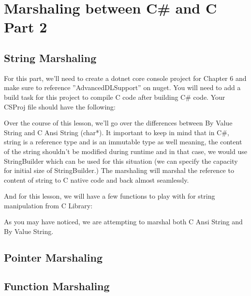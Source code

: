 \chapter{Marshaling between C\# and C Part 2}
\section{String Marshaling}
For this part, we'll need to create a dotnet core console project for Chapter 6 and make sure to reference ''AdvancedDLSupport'' on nuget. You will need to add a build task for this project to compile C code after building C\# code. Your CSProj file should have the following:


Over the course of this lesson, we'll go over the differences between By Value String and C Ansi String (char*). It important to keep in mind that in C\#, string is a reference type and is an immutable type as well meaning, the content of the string shouldn't be modified during runtime and in that case, we would use StringBuilder which can be used for this situation (we can specify the capacity for initial size of StringBuilder.) The marshaling will marshal the reference to content of string to C native code and back almost seamlessly.

\newpage
And for this lesson, we will have a few functions to play with for string manipulation from C Library:



As you may have noticed, we are attempting to marshal both C Ansi String and By Value String.

\section{Pointer Marshaling}

\section{Function Marshaling}